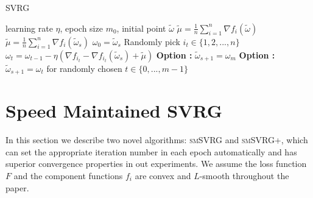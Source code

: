 \documentclass[conference]{IEEEtran}
\begin{document}

 \begin{algorithm}[t]
 	\caption{\textsc{SVRG}}
	\label{SVRG}
	\begin{algorithmic}[1]
	\Require learning rate $\eta$,  epoch size $m_0$, initial point $\tilde{\omega}$
	\State $\tilde{\mu} = \frac{1}{n}\sum\limits_{i=1}^{n}\nabla f_{i}(\tilde{\omega})$
		\State $\tilde{\mu} = \frac{1}{n}\sum\limits_{i=1}^{n}\nabla f_{i}(\tilde{\omega}_{s})$
		\State $\omega_0 = \tilde{\omega}_s$
			\State Randomly pick $i_t\in\{1, 2, ..., n\}$
			\State $\omega_t = \omega_{t-1} - \eta(\nabla f_{i_t} - \nabla f_{i_t}(\tilde{\omega}_s)+\tilde{\mu})$
		\EndFor
		\State \textbf{Option \uppercase\expandafter{}:} $\tilde{\omega}_{s+1} = \omega_{m}$
		\State \textbf{Option \uppercase\expandafter{}:} $\tilde{\omega}_{s+1} = \omega_{t}$ for randomly chosen $t \in \{0, ... ,m - 1\}$ 
	\EndFor
	\end{algorithmic}
\end{algorithm}




 \section{Speed Maintained SVRG}
 In this section we describe two novel algorithms: \textsc{smSVRG} and \textsc{smSVRG+}, which can set the appropriate iteration number in each epoch automatically and has superior convergence properties in out experiments.
 We assume the loss function $F$ and the component functions $f_i$ are convex and $L$-smooth throughout the paper.
 
\end{document}
